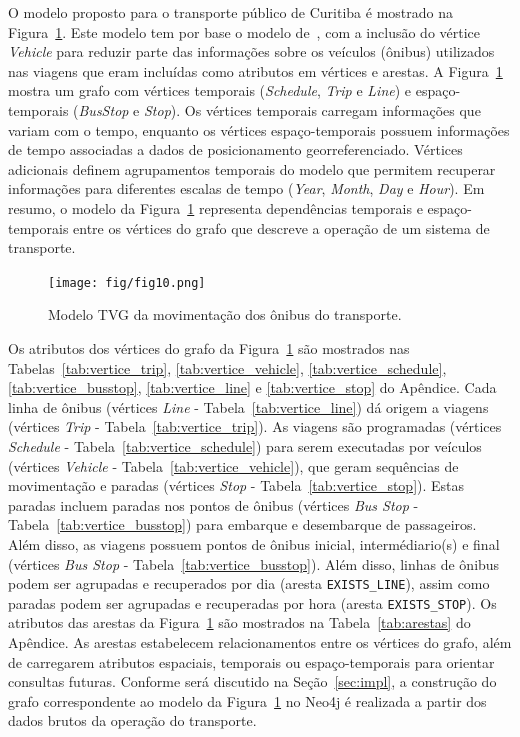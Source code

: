 O modelo proposto para o transporte público de Curitiba é mostrado na Figura~\ref{fig:model}. Este modelo tem por base o modelo de~\cite{wach:19}, com a inclusão do vértice \emph{Vehicle} para reduzir parte das informações sobre os veículos (ônibus) utilizados nas viagens que eram incluídas como atributos em vértices e arestas. A Figura~\ref{fig:model} mostra um grafo com vértices temporais (\emph{Schedule}, \emph{Trip} e \emph{Line}) e espaço-temporais (\emph{BusStop} e \emph{Stop}). Os vértices temporais carregam informações que variam com o tempo, enquanto os vértices espaço-temporais possuem informações de tempo associadas a dados de posicionamento georreferenciado. Vértices adicionais definem agrupamentos temporais do modelo que permitem recuperar informações para diferentes escalas de tempo (\emph{Year}, \emph{Month}, \emph{Day} e \emph{Hour}). Em resumo, o modelo da Figura~\ref{fig:model} representa dependências temporais e espaço-temporais entre os vértices do grafo que descreve a operação de um sistema de transporte.

\begin{figure}
\centering
\texttt{[image: fig/fig10.png]}
\caption{Modelo TVG da movimentação dos ônibus do transporte.}
\label{fig:model}
\end{figure}



Os atributos dos vértices do grafo da Figura~\ref{fig:model} são mostrados nas Tabelas~\ref{tab:vertice_trip}, \ref{tab:vertice_vehicle}, \ref{tab:vertice_schedule}, \ref{tab:vertice_busstop}, \ref{tab:vertice_line} e \ref{tab:vertice_stop} do Apêndice. 
Cada linha de ônibus (vértices \emph{Line} - Tabela~\ref{tab:vertice_line}) dá origem a viagens (vértices \emph{Trip} - Tabela~\ref{tab:vertice_trip}). As viagens são programadas (vértices \emph{Schedule} - Tabela~\ref{tab:vertice_schedule}) para serem executadas por veículos (vértices \emph{Vehicle} - Tabela~\ref{tab:vertice_vehicle}), que geram sequências de movimentação e paradas (vértices \emph{Stop} - Tabela~\ref{tab:vertice_stop}). Estas paradas incluem paradas nos pontos de ônibus (vértices \emph{Bus Stop} - Tabela~\ref{tab:vertice_busstop}) para embarque e desembarque de passageiros. Além disso, as viagens possuem pontos de ônibus inicial, intermédiario(s) e final (vértices \emph{Bus Stop} - Tabela~\ref{tab:vertice_busstop}). Além disso, linhas de ônibus podem ser agrupadas e recuperados por dia (aresta \texttt{EXISTS\_LINE}), assim como paradas podem ser agrupadas e recuperadas por hora (aresta \texttt{EXISTS\_STOP}). Os atributos das arestas da Figura~\ref{fig:model} são mostrados na Tabela~\ref{tab:arestas} do Apêndice. As arestas estabelecem relacionamentos entre os vértices do grafo, além de carregarem atributos espaciais, temporais ou espaço-temporais para orientar consultas futuras.
Conforme será discutido na Seção~\ref{sec:impl}, a construção do grafo correspondente ao modelo da Figura~\ref{fig:model} no Neo4j é realizada a partir dos dados brutos da operação do transporte.

